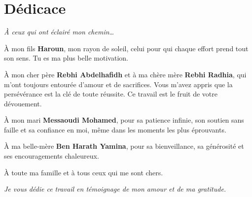 \chapter*{Dédicace}

\vspace{2cm}

\begin{center}
\textit{\large À ceux qui ont éclairé mon chemin\ldots}
\end{center}

\vspace{1.5cm}

\noindent À mon fils \textbf{Haroun}, mon rayon de soleil, celui pour qui chaque effort prend tout son sens. Tu es ma plus belle motivation.

\bigskip

\noindent À mon cher père \textbf{Rebhi Abdelhafidh} et à ma chère mère \textbf{Rebhi Radhia}, qui m'ont toujours entourée d'amour et de sacrifices. Vous m'avez appris que la persévérance est la clé de toute réussite. Ce travail est le fruit de votre dévouement.

\bigskip

\noindent À mon mari \textbf{Messaoudi Mohamed}, pour sa patience infinie, son soutien sans faille et sa confiance en moi, même dans les moments les plus éprouvants.

\bigskip

\noindent À ma belle-mère \textbf{Ben Harath Yamina}, pour sa bienveillance, sa générosité et ses encouragements chaleureux.

\bigskip

\noindent À toute ma famille et à tous ceux qui me sont chers.

\vspace{2cm}

\begin{flushright}
\textit{Je vous dédie ce travail en témoignage de mon amour et de ma gratitude.}
\end{flushright}

\clearpage
